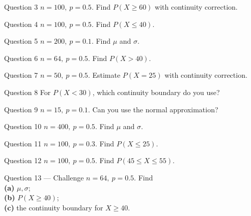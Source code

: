 \documentclass[11pt]{article}
\begin{document}
\begin{qbox}{Question 3}
$n=100,\ p=0.5$. Find $P(X\ge60)$ with continuity correction.\workspace{2.4cm}
\end{qbox}

\begin{qbox}{Question 4}
$n=100,\ p=0.5$. Find $P(X\le40)$.\workspace{2.4cm}
\end{qbox}

\begin{qbox}{Question 5}
$n=200,\ p=0.1$. Find $\mu$ and $\sigma$.\workspace{2.4cm}
\end{qbox}

\begin{qbox}{Question 6}
$n=64,\ p=0.5$. Find $P(X>40)$.\workspace{2.4cm}
\end{qbox}

\begin{qbox}{Question 7}
$n=50,\ p=0.5$. Estimate $P(X=25)$ with continuity correction.\workspace{2.4cm}
\end{qbox}

\begin{qbox}{Question 8}
For $P(X<30)$, which continuity boundary do you use?\workspace{2.4cm}
\end{qbox}

\begin{qbox}{Question 9}
$n=15,\ p=0.1$. Can you use the normal approximation?\workspace{2.4cm}
\end{qbox}

\begin{qbox}{Question 10}
$n=400,\ p=0.5$. Find $\mu$ and $\sigma$.\workspace{2.4cm}
\end{qbox}

\begin{qbox}{Question 11}
$n=100,\ p=0.3$. Find $P(X\le25)$.\workspace{2.4cm}
\end{qbox}

\begin{qbox}{Question 12}
$n=100,\ p=0.5$. Find $P(45\le X\le55)$.\workspace{2.4cm}
\end{qbox}

\begin{qbox}{Question 13 --- Challenge}
$n=64,\ p=0.5$. Find \\ \textbf{(a)} $\mu,\sigma$; \\ \textbf{(b)} $P(X\ge40)$; \\ \textbf{(c)} the continuity boundary for $X\ge40$.\workspace{3.4cm}
\end{qbox}
\end{document}
